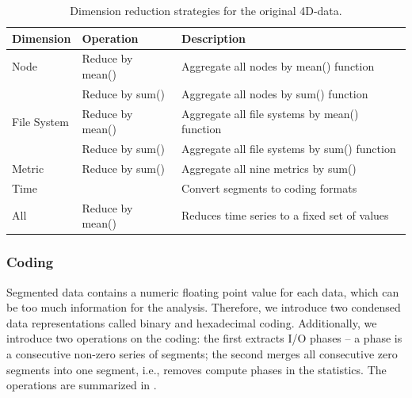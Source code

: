 \documentclass[]{llncs}
\begin{document}
\begin{table}
	\centering
	\begin{tabularx}{\textwidth}{llX}
		Dimension       & Operation                                    &  Description                                                       \\
		\hline
		Node            & Reduce by mean()                             &  Aggregate all nodes by mean() function                            \\
		                & Reduce by sum()                              &  Aggregate all nodes by sum() function                             \\
		\hline
		File System     & Reduce by mean()                             &  Aggregate all file systems by mean() function                     \\
		                &
		Reduce by sum() & Aggregate all file systems by sum() function \\
		\hline
		Metric          & Reduce by sum()                              &  Aggregate all nine metrics by sum()                               \\
		\hline
		Time            &                                              &  Convert segments to coding formats \\
		\hline
    All     & Reduce by mean()    &  Reduces time series to a fixed set of values                      \\
		\hline
	\end{tabularx}
	\caption{Dimension reduction strategies for the original 4D-data.}
	\label{tab:reduction_techniques}
\end{table}

\subsubsection{Coding}

Segmented data contains a numeric floating point value for each data, which can be too much information for the analysis.
Therefore, we introduce two condensed data representations called binary and hexadecimal coding.
Additionally, we introduce two operations on the coding:
the first extracts I/O phases -- a phase is a consecutive non-zero series of segments;
the second merges all consecutive zero segments into one segment, i.e., removes compute phases in the statistics.
The operations are summarized in .
\end{document}
